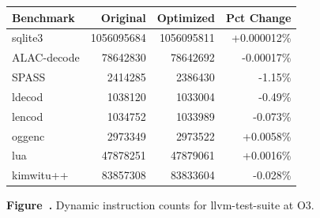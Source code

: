 \par\vspace{1.2em}

\begin{center}
{\normalfont\normalsize
\setlength{\tabcolsep}{5pt}
\renewcommand{\arraystretch}{1.08}
\begin{tabular}{@{}lrrr@{}}
\toprule
Benchmark & Original & Optimized & Pct Change \\
\midrule
sqlite3 & 1056095684 & 1056095811 & +0.000012\% \\
ALAC-decode & 78642830 & 78642692 & -0.00017\% \\
SPASS & 2414285 & 2386430 & -1.15\% \\
ldecod & 1038120 & 1033004 & -0.49\% \\
lencod & 1034752 & 1033989 & -0.073\% \\
oggenc & 2973349 & 2973522 & +0.0058\% \\
lua & 47878251 & 47879061 & +0.0016\% \\
kimwitu++ & 83857308 & 83833604 & -0.028\% \\
\bottomrule
\end{tabular}
}
\end{center}

\vspace{0.12em}

\label{fig:figure13}

\begin{center}
\small\textbf{Figure~\thefigure.} Dynamic instruction counts for llvm-test-suite at O3.
\end{center}

\par\vspace{1.2em}
